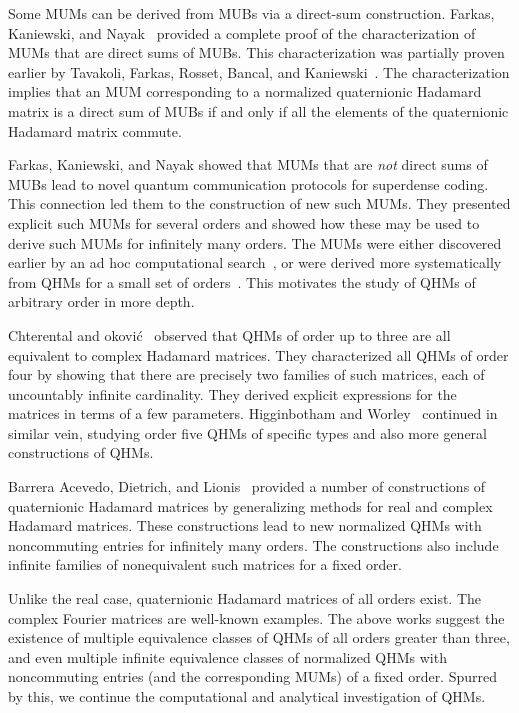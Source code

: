 \documentclass[12pt]{article}
\numberwithin{equation}{section}
\begin{document}
Some MUMs can be derived from MUBs via a direct-sum construction.
Farkas, Kaniewski, and Nayak~\cite{FKN23-mum-superdense-coding} provided a complete proof of the characterization of MUMs that are direct sums of MUBs.
This characterization was
partially proven earlier by Tavakoli, Farkas, Rosset, Bancal, and Kaniewski~\cite{TFR+21-mubs}.
The characterization implies that an MUM corresponding to a normalized quaternionic Hadamard matrix
is a direct sum of MUBs if and only if all the elements of the quaternionic Hadamard matrix commute.

Farkas, Kaniewski, and Nayak showed that MUMs that are \emph{not\/} direct sums of MUBs lead to novel quantum communication protocols for superdense coding. This connection led them to the construction of new such MUMs. They presented explicit such MUMs for several orders and showed how these may be used to derive such MUMs for infinitely many orders. The MUMs were either discovered earlier by an ad hoc computational search~\cite{TFR+21-mubs}, or were derived more systematically from QHMs for a small set of orders~\cite{FKN23-mum-superdense-coding}. This motivates the study of QHMs of arbitrary order in more depth.

Chterental and {\DJ}okovi{\'c}~\cite{CD08-stochastic-matrices} observed that QHMs of order up to three are all equivalent to complex Hadamard matrices. They characterized all QHMs of order four by showing that there are precisely two families of such matrices, each of uncountably infinite cardinality. They derived explicit expressions for the matrices in terms of a few parameters. Higginbotham and Worley~\cite{HW22-qhm} continued in similar vein, studying order five QHMs of specific types and also more general constructions of QHMs.

Barrera Acevedo, Dietrich, and Lionis~\cite{BarreraAcevedo2024} provided a number of constructions of quaternionic Hadamard matrices by generalizing methods for real and complex Hadamard matrices. These constructions lead to new normalized QHMs with noncommuting entries for infinitely many orders. The constructions also include infinite families of nonequivalent such matrices for a fixed order.

Unlike the real case, quaternionic Hadamard matrices of all orders exist. The complex Fourier matrices are well-known examples.
The above works suggest the existence of multiple equivalence classes of QHMs of all orders greater than three, and even multiple infinite equivalence classes of normalized QHMs with noncommuting entries (and the corresponding MUMs) of a fixed order. Spurred by this, we continue the computational and analytical investigation of QHMs.
\end{document}
